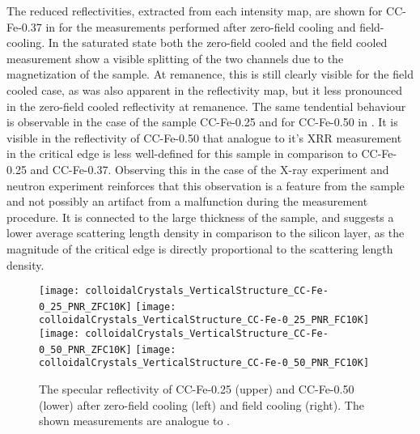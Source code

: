 \documentclass[\main/dresen_thesis.tex]{subfiles}
\begin{document}
  The reduced reflectivities, extracted from each intensity map, are shown for CC-Fe-0.37 in  for the measurements performed after zero-field cooling and field-cooling.
  In the saturated state both the zero-field cooled and the field cooled measurement show a visible splitting of the two channels due to the magnetization of the sample.
  At remanence, this is still clearly visible for the field cooled case, as was also apparent in the reflectivity map, but it less pronounced in the zero-field cooled reflectivity at remanence.
  The same tendential behaviour is observable in the case of the sample CC-Fe-0.25 and for CC-Fe-0.50 in .
  It is visible in the reflectivity of CC-Fe-0.50 that analogue to it's XRR measurement in  the critical edge is less well-defined for this sample in comparison to CC-Fe-0.25 and CC-Fe-0.37.
  Observing this in the case of the X-ray experiment and neutron experiment reinforces that this observation is a feature from the sample and not possibly an artifact from a malfunction during the measurement procedure.
  It is connected to the large thickness of the sample, and suggests a lower average scattering length density in comparison to the silicon layer, as the magnitude of the critical edge is directly proportional to the scattering length density.


  \begin{figure}[tb]
    \centering
    \texttt{[image: colloidalCrystals\_VerticalStructure\_CC-Fe-0\_25\_PNR\_ZFC10K]}
    \texttt{[image: colloidalCrystals\_VerticalStructure\_CC-Fe-0\_25\_PNR\_FC10K]}
    \texttt{[image: colloidalCrystals\_VerticalStructure\_CC-Fe-0\_50\_PNR\_ZFC10K]}
    \texttt{[image: colloidalCrystals\_VerticalStructure\_CC-Fe-0\_50\_PNR\_FC10K]}
    \caption{\label{fig:colloidalCrystals:pnrCCFe2550} The specular reflectivity of CC-Fe-0.25 (upper) and CC-Fe-0.50 (lower) after zero-field cooling (left) and field cooling (right). The shown measurements are analogue to .}
  \end{figure}
\end{document}
